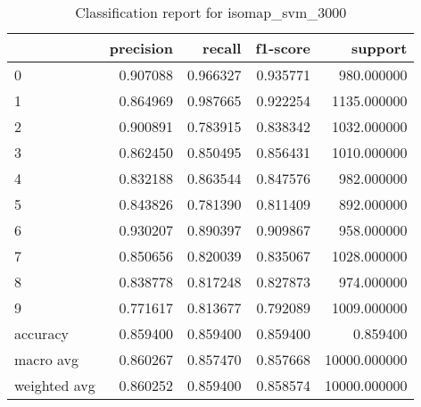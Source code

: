 \begin{table}[htb!]
\centering
\caption{Classification report for isomap_svm_3000}
\label{tab:classification-report-isomap_svm_3000}
\begin{tabular}{lrrrr}
\toprule
 & precision & recall & f1-score & support \\
\midrule
0 & 0.907088 & 0.966327 & 0.935771 & 980.000000 \\
1 & 0.864969 & 0.987665 & 0.922254 & 1135.000000 \\
2 & 0.900891 & 0.783915 & 0.838342 & 1032.000000 \\
3 & 0.862450 & 0.850495 & 0.856431 & 1010.000000 \\
4 & 0.832188 & 0.863544 & 0.847576 & 982.000000 \\
5 & 0.843826 & 0.781390 & 0.811409 & 892.000000 \\
6 & 0.930207 & 0.890397 & 0.909867 & 958.000000 \\
7 & 0.850656 & 0.820039 & 0.835067 & 1028.000000 \\
8 & 0.838778 & 0.817248 & 0.827873 & 974.000000 \\
9 & 0.771617 & 0.813677 & 0.792089 & 1009.000000 \\
accuracy & 0.859400 & 0.859400 & 0.859400 & 0.859400 \\
macro avg & 0.860267 & 0.857470 & 0.857668 & 10000.000000 \\
weighted avg & 0.860252 & 0.859400 & 0.858574 & 10000.000000 \\
\bottomrule
\end{tabular}
\end{table}
